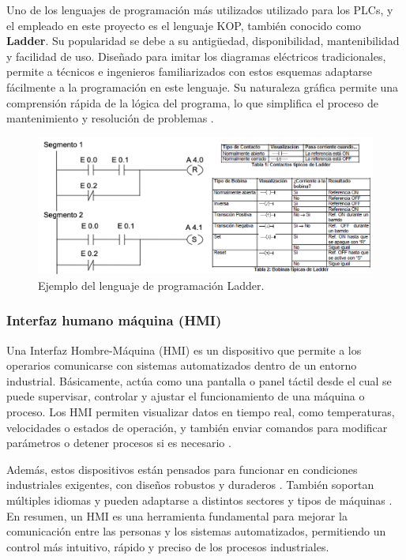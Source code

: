 Uno de los lenguajes de programación más utilizados utilizado para los PLCs, y el empleado en este proyecto es el lenguaje KOP, también conocido como \textbf{Ladder}. Su popularidad se debe a su antigüedad, disponibilidad, mantenibilidad y facilidad de uso. Diseñado para imitar los diagramas eléctricos tradicionales, permite a técnicos e ingenieros familiarizados con estos esquemas adaptarse fácilmente a la programación en este lenguaje. Su naturaleza gráfica permite una comprensión rápida de la lógica del programa, lo que simplifica el proceso de mantenimiento y resolución de problemas \cite{ladder_info}.

\begin{figure} [h!]
  \begin{center}
    \includegraphics[width=15cm]{figs/ladder}
  \end{center}
  \caption{\centering Ejemplo del lenguaje de programación Ladder.}
  \label{fig:ladder}
\end{figure} 


\subsubsection{Interfaz humano máquina (HMI)}

Una Interfaz Hombre-Máquina (HMI) es un dispositivo que permite a los operarios comunicarse con sistemas automatizados dentro de un entorno industrial. Básicamente, actúa como una pantalla o panel táctil desde el cual se puede supervisar, controlar y ajustar el funcionamiento de una máquina o proceso. Los HMI permiten visualizar datos en tiempo real, como temperaturas, velocidades o estados de operación, y también enviar comandos para modificar parámetros o detener procesos si es necesario \cite{hmi}.

Además, estos dispositivos están pensados para funcionar en condiciones industriales exigentes, con diseños robustos y duraderos \cite{hmi}. También soportan múltiples idiomas y pueden adaptarse a distintos sectores y tipos de máquinas \cite{hmi}. En resumen, un HMI es una herramienta fundamental para mejorar la comunicación entre las personas y los sistemas automatizados, permitiendo un control más intuitivo, rápido y preciso de los procesos industriales.

